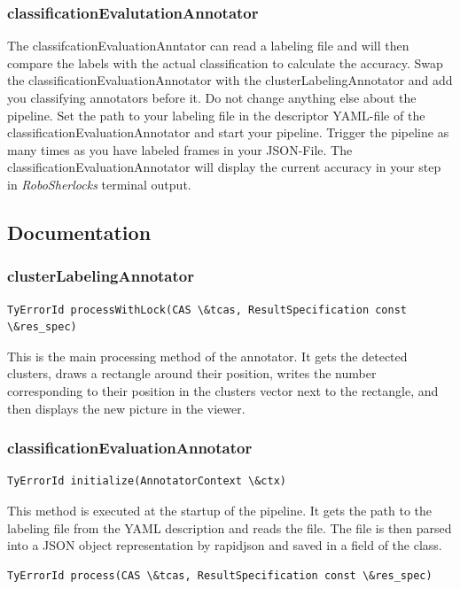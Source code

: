 \documentclass[main.tex]{subfiles}
\begin{document}
\subsubsection{classificationEvalutationAnnotator}
The classifcationEvaluationAnntator can read a labeling file and will then compare the labels with the actual classification to calculate the accuracy. Swap the classificationEvaluationAnnotator with the clusterLabelingAnnotator and add you classifying annotators before it. Do not change anything else about the pipeline. Set the path to your labeling file in the descriptor YAML-file of the classificationEvaluationAnnotator and start your pipeline. Trigger the pipeline as many times as you have labeled frames in your JSON-File. The classificationEvaluationAnnotator will display the current accuracy in your step in \textit{RoboSherlocks} terminal output. 

\subsection{Documentation}
\subsubsection{clusterLabelingAnnotator}
\begin{lstlisting}
TyErrorId processWithLock(CAS \&tcas, ResultSpecification const \&res_spec)
\end{lstlisting}
This is the main processing method of the annotator. It gets the detected clusters, draws a rectangle around their position, writes the number corresponding to their position in the clusters vector next to the rectangle, and then displays the new picture in the viewer.


\subsubsection{classificationEvaluationAnnotator}
\begin{lstlisting}
TyErrorId initialize(AnnotatorContext \&ctx)
\end{lstlisting}

This method is executed at the startup of the pipeline.  It gets the path to the labeling file from the YAML description and reads the file. The file is then parsed into a JSON object representation by rapidjson and saved in a field of the class.

\begin{lstlisting}
TyErrorId process(CAS \&tcas, ResultSpecification const \&res_spec)
\end{lstlisting}
\end{document}

